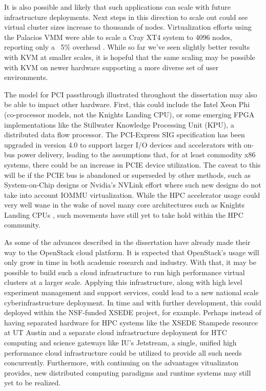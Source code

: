 It is also possible and likely that such applications can scale with future infrastructure deployments.  Next steps in this direction to scale out could see virtual cluster sizes increase to thousands of nodes. Virtualization efforts using the Palacios VMM were able to scale a Cray XT4 system to 4096 nodes, reporting only a ~5\% overhead \cite{lange2011minimal}. While so far we've seen slightly better results with KVM at smaller scales, it is hopeful that the same scaling may be possible with KVM on newer hardware supporting a more diverse set of user environments.  

The model for PCI passthrough illustrated throughout the dissertation may also be able to impact other hardware. First, this could include the Intel Xeon Phi (co-processor models, not the Knights Landing CPU), or some emerging FPGA implementations like the Stillwater Knowledge Processing Unit (KPU), a distributed data flow processor.  The PCI-Express SIG specification has been upgraded in version 4.0 to support larger I/O devices and accelerators with on-bus power delivery, leading to the assumptions that, for at least commodity x86 systems, there could be an increase in PCIE device utilization. The caveat to this will be if the PCIE bus is abandoned or superseded by other methods, such as System-on-Chip designs or Nvidia's NVLink effort \cite{agarwal2015unlocking} where such new designs do not take into account IOMMU virtualization.  While the HPC accelerator usage could very well wane in the wake of novel many core architectures such as Knights Landing CPUs \cite{hemmert2016trinity}, such movements have still yet to take hold within the HPC community.  

As some of the advances described in the dissertation have already made their way to the OpenStack cloud platform. It is expected that OpenStack's usage will only grow in time in both academic research and industry.  With that, it may be possible to build such a cloud infrastructure to run high performance virtual clusters at a larger scale. Applying this infrastructure, along with high level experiment management and support services, could lead to a new national scale cyberinfrastructure deployment.  In time and with further development, this could deployed within the NSF-funded XSEDE project, for example. Perhaps instead of having separated hardware for HPC systems like the XSEDE Stampede resource at UT Austin and a separate cloud infrastructure deployment for HTC computing and science gateways like IU's Jetstream, a single, unified high performance cloud infrastructure could be utilized to provide all such needs concurrently.  Furthermore, with continuing on the advantages vitualizaton provides, new distributed computing paradigms and runtime systems may still yet to be realized.   

